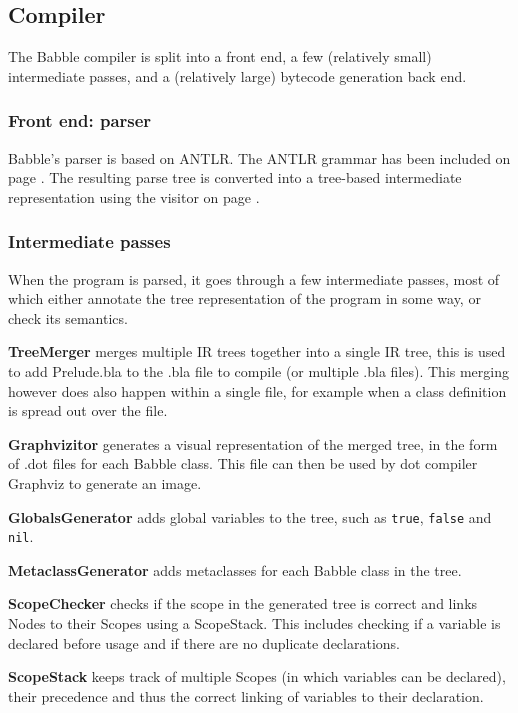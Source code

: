 \documentclass[a4paper]{article}
\begin{document}
\subsection{Compiler}

The Babble compiler is split into a front end, a few (relatively small) intermediate passes, and a (relatively large) bytecode generation back end.

\subsubsection{Front end: parser}

Babble's parser is based on ANTLR.
The ANTLR grammar has been included on page \pageref{grammar}.
The resulting parse tree is converted into a tree-based intermediate representation using the visitor on page \pageref{visitor}.

\subsubsection{Intermediate passes}

When the program is parsed, it goes through a few intermediate passes, most of which either annotate the tree representation of the program in some way, or check its semantics.

\textbf{TreeMerger} merges multiple IR trees together into a single IR tree, this is used to add Prelude.bla to the .bla file to compile (or multiple .bla files). This merging however does also happen within a single file, for example when a class definition is spread out over the file.

\textbf{Graphvizitor} generates a visual representation of the merged tree, in the form of .dot files for each Babble class. This file can then be used by dot compiler Graphviz to generate an image.

\textbf{GlobalsGenerator} adds global variables to the tree, such as \texttt{true}, \texttt{false} and \texttt{nil}.

\textbf{MetaclassGenerator} adds metaclasses for each Babble class in the tree.

\textbf{ScopeChecker} checks if the scope in the generated tree is correct and links Nodes to their Scopes using a ScopeStack. This includes checking if a variable is declared before usage and if there are no duplicate declarations.

\textbf{ScopeStack} keeps track of multiple Scopes (in which variables can be declared), their precedence and thus the correct linking of variables to their declaration.
\end{document}
